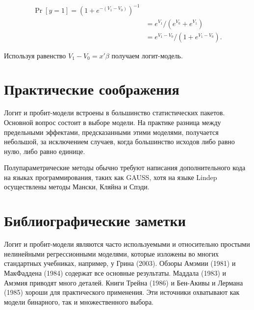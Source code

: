 \begin{equation} 
\label{GrindEQ__14_34_}
\begin{split} 
\Pr[y=1] = (1+e^{-(V_1 - V_0)})^{-1} \\
& = e^{V_1}/(e^{V_0} + e^{V_1}) \\
& = e^{V_1 - V_0}/(1 + e^{V_1 - V_0}). 
\end{split}
\end{equation} 

Используя равенство  $V_1 - V_0 = x'\beta $ получаем логит-модель. 

\section{Практические соображения}

Логит и пробит-модели встроены в большинство статистических пакетов. Основной вопрос состоит в выборе модели. На практике разница между предельными эффектами,  предсказанными этими моделями,  получается небольшой,  за исключением случаев, когда большинство исходов либо равно нулю,  либо равно единице.

Полупараметрические методы обычно требуют написания дополнительного кода на языках программирования,  таких как GAUSS,  хотя на языке Lindep осуществлены методы Мански,  Кляйна и Спэди.

\section{Библиографические заметки}

Логит и пробит-модели являются часто используемыми и относительно простыми нелинейными регрессионными моделями,  которые изложены во многих стандартных учебниках,  например, у Грина (2003). Обзоры Амэмии (1981)  и МакФаддена  (1984)  содержат все основные результаты. Маддала  (1983)  и Амэмия приводят много деталей. Книги Трейна (1986) и Бен-Акивы и Лермана (1985) хороши для практического применения. Эти источники охватывают как модели бинарного,  так и множественного выбора.

